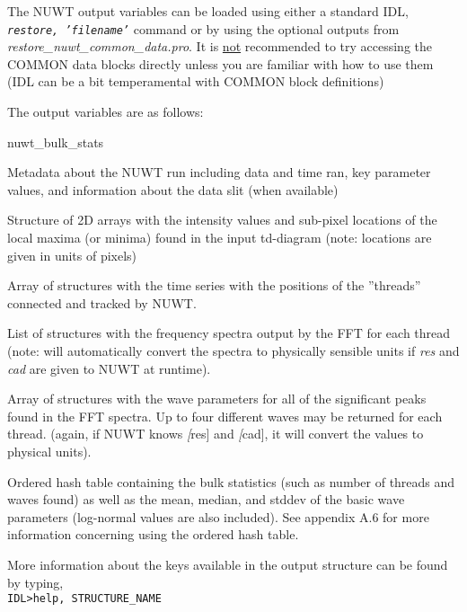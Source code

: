 \documentclass{article}
\begin{document}
The NUWT output variables can be loaded using either a standard IDL, \texttt{\textit{restore, 'filename'}} command or by using the optional outputs from \textit{restore\_nuwt\_common\_data.pro}. It is \underline{not} recommended to try accessing the COMMON data blocks directly unless you are familiar with how to use them (IDL can be a bit temperamental with COMMON block definitions)

The output variables are as follows: \\

\begin{labeling}{nuwt\_bulk\_stats}
\item [nuwt\_meta] Metadata about the NUWT run including data and time ran, key parameter values, and information about the data slit (when available)
\item [nuwt\_located] Structure of 2D arrays with the intensity values and sub-pixel locations of the local maxima (or minima) found in the input td-diagram (note: locations are given in units of pixels)
\item [nuwt\_threads] Array of structures with the time series with the positions of the ''threads'' connected and tracked by NUWT.
\item [nuwt\_fft\_spec]	List of structures with the frequency spectra output by the FFT for each thread (note: will automatically convert the spectra to physically sensible units if \textit{res} and \textit{cad} are given to NUWT at runtime).
\item [nuwt\_fft\_peaks] Array of structures with the wave parameters for all of the significant peaks found in the FFT spectra. Up to four different waves may be returned for each thread. (again, if NUWT knows \textit[res] and \textit[cad], it will convert the values to physical units).
\item [nuwt\_bulk\_stats] Ordered hash table containing the bulk statistics (such as number of threads and waves found) as well as the mean, median, and stddev of the basic wave parameters (log-normal values are also included). See appendix A.6 for more information concerning using the ordered hash table.
\end{labeling}

More information about the keys available in the output structure can be found by typing, \\

\hspace{0.5cm}\texttt{IDL\textgreater help, STRUCTURE\_NAME} \\
\end{document}
